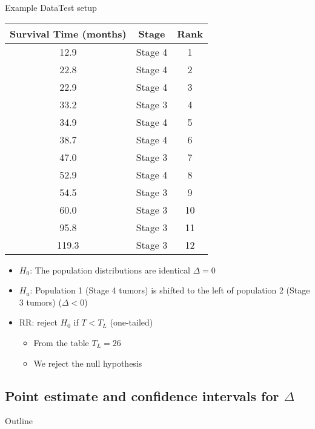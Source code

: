 \documentclass[xcolor=dvipsnames]{beamer}
\begin{document}
\begin{frame}{Example Data}{Test setup}
\begin{center}{\tiny
		\begin{tabular}{|c|c|c|}
			\hline
			\textbf{Survival Time (months)} &  \textbf{Stage} & \textbf{Rank}\\ \hline \hline
			12.9 &Stage 4 & 1 \\ \hline
			22.8 &Stage 4 & 2\\ \hline
			22.9& Stage 4 & 3\\ \hline
			33.2 &Stage 3 & 4\\ \hline
			34.9& Stage 4 & 5\\ \hline
			38.7 &Stage 4 & 6\\ \hline
			47.0 &Stage 3 & 7\\ \hline		
			52.9  &Stage 4 & 8\\ \hline
			54.5 &Stage 3 & 9\\ \hline				
			60.0 &Stage 3 & 10\\ \hline
			95.8& Stage 3 & 11\\ \hline
			119.3 &Stage 3 & 12\\ \hline
	\end{tabular}}
\end{center}
\begin{itemize}
	\item $H_0$: The population distributions are identical $\Delta = 0$ \pause
	\item $H_a$: Population 1 (Stage 4 tumors) is shifted to the left of population 2 (Stage 3 tumors) ($\Delta < 0$) \pause
	\item RR: reject $H_0$ if $T < T_L$ (one-tailed) \pause
	\begin{itemize}
		\item From the table $T_L = 26$ \pause
		\item We reject the null hypothesis
	\end{itemize}
\end{itemize}
\end{frame}

\subsection{Point estimate and confidence intervals for $\Delta$}
\begin{frame}{Outline}
\tableofcontents[currentsection,subsectionstyle=show/shaded/hide]
\end{frame}
\end{document}
